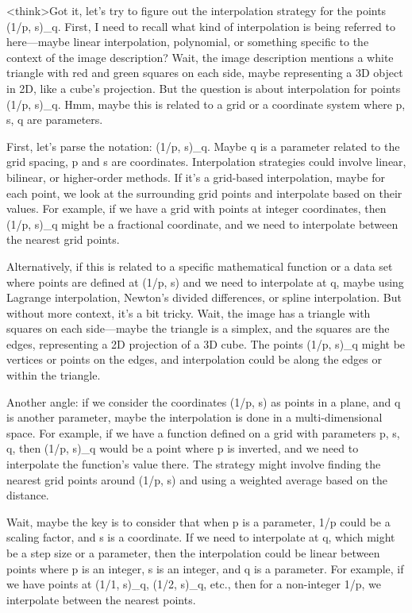 <think>Got it, let's try to figure out the interpolation strategy for the points (1/p, s)_q. First, I need to recall what kind of interpolation is being referred to here—maybe linear interpolation, polynomial, or something specific to the context of the image description? Wait, the image description mentions a white triangle with red and green squares on each side, maybe representing a 3D object in 2D, like a cube's projection. But the question is about interpolation for points (1/p, s)_q. Hmm, maybe this is related to a grid or a coordinate system where p, s, q are parameters. 

First, let's parse the notation: (1/p, s)_q. Maybe q is a parameter related to the grid spacing, p and s are coordinates. Interpolation strategies could involve linear, bilinear, or higher-order methods. If it's a grid-based interpolation, maybe for each point, we look at the surrounding grid points and interpolate based on their values. For example, if we have a grid with points at integer coordinates, then (1/p, s)_q might be a fractional coordinate, and we need to interpolate between the nearest grid points. 

Alternatively, if this is related to a specific mathematical function or a data set where points are defined at (1/p, s) and we need to interpolate at q, maybe using Lagrange interpolation, Newton's divided differences, or spline interpolation. But without more context, it's a bit tricky. Wait, the image has a triangle with squares on each side—maybe the triangle is a simplex, and the squares are the edges, representing a 2D projection of a 3D cube. The points (1/p, s)_q might be vertices or points on the edges, and interpolation could be along the edges or within the triangle. 

Another angle: if we consider the coordinates (1/p, s) as points in a plane, and q is another parameter, maybe the interpolation is done in a multi-dimensional space. For example, if we have a function defined on a grid with parameters p, s, q, then (1/p, s)_q would be a point where p is inverted, and we need to interpolate the function's value there. The strategy might involve finding the nearest grid points around (1/p, s) and using a weighted average based on the distance. 

Wait, maybe the key is to consider that when p is a parameter, 1/p could be a scaling factor, and s is a coordinate. If we need to interpolate at q, which might be a step size or a parameter, then the interpolation could be linear between points where p is an integer, s is an integer, and q is a parameter. For example, if we have points at (1/1, s)_q, (1/2, s)_q, etc., then for a non-integer 1/p, we interpolate between the nearest points. 

